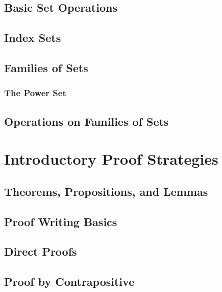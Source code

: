 \documentclass{article}
\begin{document}
\subsection{Basic Set Operations}
\subsection{Index Sets}
\subsection{Families of Sets}
\subsubsection{The Power Set}
\subsection{Operations on Families of Sets}

\section{Introductory Proof Strategies}
\subsection{Theorems, Propositions, and Lemmas}
\subsection{Proof Writing Basics}
\subsection{Direct Proofs}
\subsection{Proof by Contrapositive}
\end{document}
